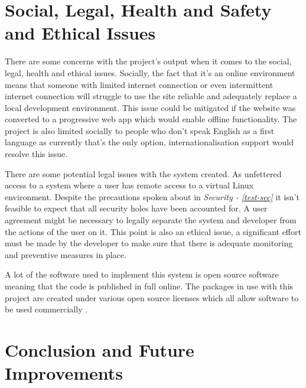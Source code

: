 \documentclass[12pt, a4paper]{extreport}
\begin{document}
\chapter{Social, Legal, Health and Safety and Ethical Issues}


There are some concerns with the project's output when it comes to the social, legal, health and ethical issues. Socially, the fact that it's an online environment means that someone with limited internet connection or even intermittent internet connection will struggle to use the site reliable and adequately replace a local development environment. This issue could be mitigated if the website was converted to a progressive web app which would enable offline functionality. The project is also limited socially to people who don't speak English as a first language as currently that's the only option, internationalisation support would resolve this issue.

There are some potential legal issues with the system created. As unfettered access to a system where a user has remote access to a virtual Linux environment. Despite the precautions spoken about in \textit{Security - \ref{test-sec}} it isn't feasible to expect that all security holes have been accounted for. A user agreement might be necessary to legally separate the system and developer from the actions of the user on it. This point is also an ethical issue, a significant effort must be made by the developer to make sure that there is adequate monitoring and preventive measures in place.

A lot of the software used to implement this system is open source software meaning that the code is published in full online. The packages in use with this project are created under various open source licenses which all allow software to be used commercially \cite{opensource-licenses}.

\pagebreak


\chapter{Conclusion and Future Improvements} \label{conclusion}

\end{document}
